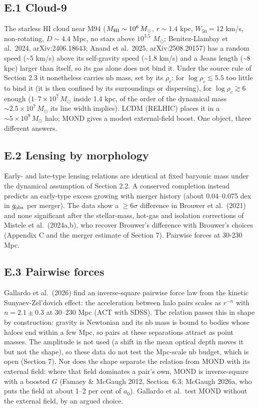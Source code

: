 \documentclass[
  10pt,
]{article}
\begin{document}
\subsection{E.1 Cloud-9}

The starless HI cloud near M94 ($M_{\rm HI}\sim10^6\,M_\odot$, $r\sim1.4$ kpc, $W_{50}=12$ km/s, non-rotating,
$D\sim4.4$ Mpc, no stars above $10^{3.5}$ $M_\odot$;
Benitez-Llambay et al.~2024, arXiv:2406.18643; Anand et al.~2025,
arXiv:2508.20157) has a random
speed (\textasciitilde{}5 km/s) above its self-gravity speed
(\textasciitilde{}1.8 km/s) and a Jeans length (\textasciitilde{}8 kpc)
larger than itself, so its gas alone does not bind it. Under the source rule of
Section 2.3 it nonetheless carries nb mass, set by its $\rho_c$: for
$\log\rho_c\lesssim5.5$ too little to bind it (it is then confined by its
surroundings or dispersing), for $\log\rho_c\gtrsim6$ enough
($1$--$7\times10^7\,M_\odot$ inside 1.4 kpc, of the order of the dynamical mass
$\sim2.5\times10^7\,M_\odot$ its line width implies). LCDM (RELHIC) places it in a
$\sim5\times10^9\,M_\odot$ halo; MOND gives a modest external-field boost.
One object, three different answers.

\subsection{E.2 Lensing by morphology}

Early- and late-type lensing relations are identical at fixed baryonic mass under the dynamical assumption of Section 2.2. A conserved completion instead predicts an early-type excess growing with merger history (about 0.04--0.075 dex in $g_{\rm obs}$ per merger). The data show a $\ge6\sigma$ difference in Brouwer et al.~(2021) and none significant after the stellar-mass, hot-gas and isolation corrections of Mistele et al.~(2024a,b), who recover Brouwer's difference with Brouwer's choices (Appendix C and the merger estimate of Section 7). Pairwise forces at 30-230 Mpc.

\subsection{E.3 Pairwise forces}

Gallardo et al.~(2026) find an inverse-square pairwise force law from the kinetic Sunyaev-Zel'dovich effect: the acceleration between halo pairs scales as $r^{-n}$ with $n=2.1\pm0.3$ at 30--230 Mpc (ACT with SDSS). The relation passes this
in shape by construction: gravity is Newtonian and its nb mass is bound to bodies whose haloes end within a few Mpc,
so pairs at these separations attract as point masses. The amplitude is not used (a shift in the mean optical depth moves it but not the shape), so these data do not test the Mpc-scale nb budget, which is open (Section 7). Nor does the shape separate the relation from MOND with its external field: where that field dominates a pair's own, MOND is inverse-square with a boosted $G$ (Famaey \& McGaugh 2012, Section~6.3; McGaugh 2026a, who puts the field at about 1--2 per cent of $a_0$). Gallardo et al.\ test MOND without the external field, by an argued choice.
\end{document}
